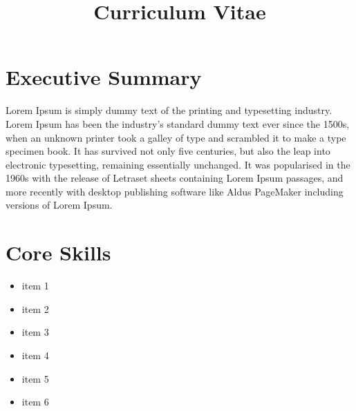 \documentclass[11pt,a4paper,sans]{moderncv} %
\title{Curriculum Vitae}
\begin{document}
\makecvtitle %

\section{Executive Summary}
Lorem Ipsum is simply dummy text of the printing and typesetting industry. Lorem Ipsum has been the industry's standard dummy text ever since the 1500s, when an unknown printer took a galley of type and scrambled it to make a type specimen book. It has survived not only five centuries, but also the leap into electronic typesetting, remaining essentially unchanged. It was popularised in the 1960s with the release of Letraset sheets containing Lorem Ipsum passages, and more recently with desktop publishing software like Aldus PageMaker including versions of Lorem Ipsum.

\section{Core Skills}
\begin{multicols}{2}
    \begin{itemize}
        \item item 1
        \item item 2
        \item item 3
        \item item 4
        \item item 5
        \item item 6
    \end{itemize}
\end{multicols}

\end{document}

